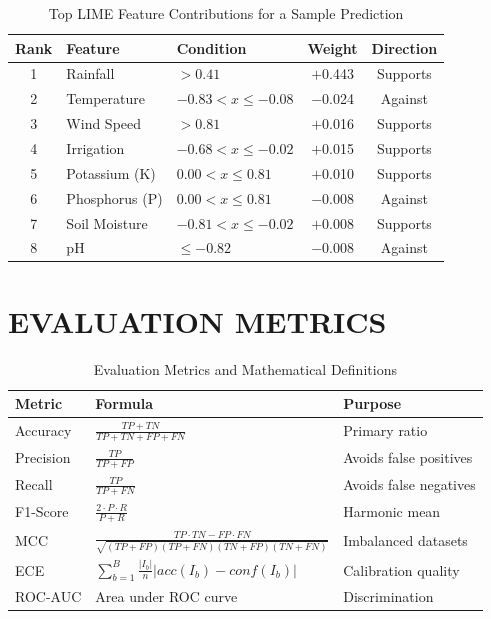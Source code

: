 \documentclass[12pt,a4paper,oneside]{report}
\begin{document}
\begin{table}[H]
\centering
\caption{Top LIME Feature Contributions for a Sample Prediction}
\label{tab:lime}
\renewcommand{\arraystretch}{1.3}
\begin{tabular}{c p{3.5cm} p{3.5cm} c c}
\toprule
\textbf{Rank} & \textbf{Feature} & \textbf{Condition} & \textbf{Weight} & \textbf{Direction} \\
\midrule
1 & Rainfall      & $> 0.41$                   & $+$0.443 & Supports \\
2 & Temperature   & $-0.83 < x \leq -0.08$     & $-$0.024 & Against  \\
3 & Wind Speed    & $> 0.81$                   & $+$0.016 & Supports \\
4 & Irrigation    & $-0.68 < x \leq -0.02$     & $+$0.015 & Supports \\
5 & Potassium (K) & $0.00 < x \leq 0.81$       & $+$0.010 & Supports \\
6 & Phosphorus (P)& $0.00 < x \leq 0.81$       & $-$0.008 & Against  \\
7 & Soil Moisture & $-0.81 < x \leq -0.02$     & $+$0.008 & Supports \\
8 & pH            & $\leq -0.82$               & $-$0.008 & Against  \\
\bottomrule
\end{tabular}
\end{table}

\section{EVALUATION METRICS}

\begin{table}[H]
\centering
\caption{Evaluation Metrics and Mathematical Definitions}
\label{tab:metrics}
\renewcommand{\arraystretch}{1.6}
\begin{tabular}{p{2.8cm} p{6cm} p{4cm}}
\toprule
\textbf{Metric} & \textbf{Formula} & \textbf{Purpose} \\
\midrule
Accuracy   & $\frac{TP + TN}{TP + TN + FP + FN}$ & Primary ratio \\[6pt]
Precision  & $\frac{TP}{TP + FP}$ & Avoids false positives \\[6pt]
Recall     & $\frac{TP}{TP + FN}$ & Avoids false negatives \\[6pt]
F1-Score   & $\frac{2 \cdot P \cdot R}{P + R}$ & Harmonic mean \\[6pt]
MCC        & $\frac{TP \cdot TN - FP \cdot FN}{\sqrt{(TP+FP)(TP+FN)(TN+FP)(TN+FN)}}$ & Imbalanced datasets \\[6pt]
ECE        & $\sum_{b=1}^{B} \frac{|I_b|}{n} |acc(I_b) - conf(I_b)|$ & Calibration quality \\[6pt]
ROC-AUC    & Area under ROC curve & Discrimination \\
\bottomrule
\end{tabular}
\end{table}
\end{document}
